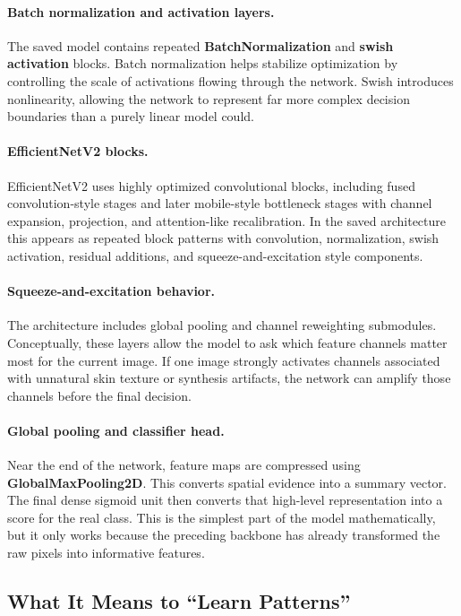 \documentclass[11pt]{article}
\begin{document}
\paragraph{Batch normalization and activation layers.}
The saved model contains repeated \textbf{BatchNormalization} and \textbf{swish activation} blocks. Batch normalization helps stabilize optimization by controlling the scale of activations flowing through the network. Swish introduces nonlinearity, allowing the network to represent far more complex decision boundaries than a purely linear model could.

\paragraph{EfficientNetV2 blocks.}
EfficientNetV2 uses highly optimized convolutional blocks, including fused convolution-style stages and later mobile-style bottleneck stages with channel expansion, projection, and attention-like recalibration. In the saved architecture this appears as repeated block patterns with convolution, normalization, swish activation, residual additions, and squeeze-and-excitation style components.

\paragraph{Squeeze-and-excitation behavior.}
The architecture includes global pooling and channel reweighting submodules. Conceptually, these layers allow the model to ask which feature channels matter most for the current image. If one image strongly activates channels associated with unnatural skin texture or synthesis artifacts, the network can amplify those channels before the final decision.

\paragraph{Global pooling and classifier head.}
Near the end of the network, feature maps are compressed using \textbf{GlobalMaxPooling2D}. This converts spatial evidence into a summary vector. The final dense sigmoid unit then converts that high-level representation into a score for the real class. This is the simplest part of the model mathematically, but it only works because the preceding backbone has already transformed the raw pixels into informative features.

\subsection{What It Means to ``Learn Patterns''}
\end{document}

